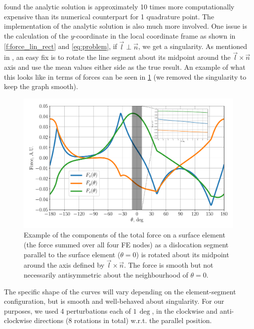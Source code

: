 \documentclass[11pt]{iopart}
\begin{document}
\citet{Queyreau} found the analytic solution is approximately 10 times more computationally expensive than its numerical counterpart for 1 quadrature point. The implementation of the analytic solution is also much more involved. One issue is the calculation of the $y$-coordinate in the local coordinate frame as shown in \cref{f:force_lin_rect} and \cref{eq:problem}, if $\vec{l} \perp \vec{n}$, we get a singularity. As mentioned in \cite{Queyreau}, an easy fix is to rotate the line segment about its midpoint around the $\vec{l} \times \vec{n}$ axis and use the mean values either side as the true result. An example of what this looks like in terms of forces can be seen in \cref{f:rotate} (we removed the singularity to keep the graph smooth).
\begin{figure}
    \centering
    \includegraphics[width=0.8\linewidth]{ftot_rotation_lin_rect_inlaid.pdf}
    \caption{Example of the components of the total force on a surface element (the force summed over all four FE nodes) as a dislocation segment parallel to the surface element ($\theta = 0$) is rotated about its midpoint around the axis defined by $\vec{l}\times\vec{n}$. The force is smooth but not necessarily antisymmetric about the neighbourhood of $\theta=0$.}
    \label{f:rotate}
\end{figure}
The specific shape of the curves will vary depending on the element-segment configuration, but is smooth and well-behaved about singularity. For our purposes, we used 4 perturbations each of $1\,\deg$, in the clockwise and anti-clockwise directions (8 rotations in total) w.r.t. the parallel position.
\end{document}
